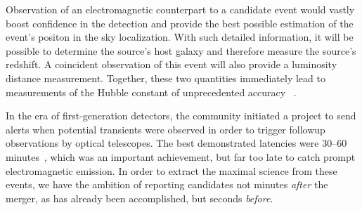 Observation of an electromagnetic counterpart to a candidate \GW{} event would
vastly boost confidence in the \GW{} detection and provide the best possible
estimation of the event's positon in the sky localization. With such detailed
information, it will be possible to determine the source's host
galaxy and therefore measure the source's redshift. A coincident \GW{}
observation of this event will also provide a luminosity distance measurement.
Together, these two quantities immediately lead to measurements of the Hubble
constant of unprecedented accuracy ~\cite{2010ApJ...725..496N}.

In the era of first-generation detectors, the \GW{} community initiated a project
to send alerts when potential \GW{} transients were observed in
order to trigger followup observations by optical telescopes.  The best
demonstrated latencies were 30--60 minutes~\cite{HugheyGWPAW2011}, which was an
important achievement, but far too late to catch prompt electromagnetic
emission. In order to extract the maximal science from these events, we have 
the ambition of reporting \GW{} candidates not minutes \emph{after} the merger, 
as has already been accomplished, but seconds \emph{before}.

